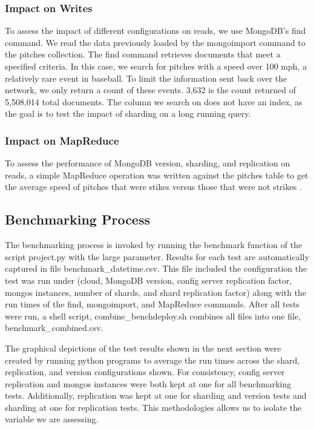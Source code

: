 \documentclass[9pt,twocolumn,twoside]{../../styles/osajnl}
\begin{document}
\subsubsection{Impact on Writes}

To assess the impact of different configurations on reads, we use MongoDB's find command.  We read the data previously loaded by the mongoimport command to the pitches collection.  The find command retrieves documents that meet a specified criteria.  In this case, we search for pitches with a speed over 100 mph, a relatively rare event in baseball.  To limit the information sent back over the network, we only return a count of these events.  3,632 is the count returned of 5,508,014 total documents.  The column we search on does not have an index, as the goal is to test the impact of sharding on a long running query.

\subsubsection{Impact on MapReduce}

To assess the performance of MongoDB version, sharding, and replication on reads, a simple MapReduce operation was written against the pitches table to get the average speed of pitches that were stikes versus those that were not strikes \cite{www-mapreduceEx} \cite{www-mapreduce}.


\subsection{Benchmarking Process}

The benchmarking process is invoked by running the benchmark function of the script project.py with the large parameter.  Results for each test are automatically captured in file benchmark\_datetime.csv.  This file included the configuration the test was run under (cloud, MongoDB version, config server replication factor, mongos instances, number of shards, and shard replication factor) along with the run times of the find, mongoimport, and MapReduce commands.  After all tests were run, a shell script, combine\_benchdeploy.sh combines all files into one file, benchmark\_combined.csv.

The graphical depictions of the test results shown in the next section were created by running python programs to average the run times across the shard, replication, and version configurations shown.  For consistency, config server replication and mongos instances were both kept at one for all benchmarking tests.  Additionally, replication was kept at one for sharding and version tests and sharding at one for replication tests.  This methodologies allows us to isolate the variable we are assessing.
\end{document}
